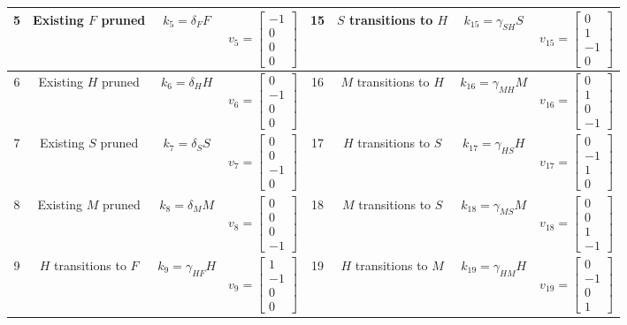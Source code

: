 \documentclass[11pt]{article}
\begin{document}
\begin{table}[h!]
{\begin{tabular}{|c|c|c|c||c|c|c|c|}
\hline
5 & Existing $F$ pruned & $k_5=\delta_FF$ & $v_5=\begin{bmatrix}-1\\0\\0\\0\end{bmatrix}$ & 15 & $S$ transitions to $H$ & $k_{15}=\gamma_{SH}S$ & $v_{15}=\begin{bmatrix}0\\1\\-1\\0\end{bmatrix}$\\
\hline
6 & Existing $H$ pruned & $k_6=\delta_HH$ & $v_6=\begin{bmatrix}0\\-1\\0\\0\end{bmatrix}$ & 16 & $M$ transitions to $H$ & $k_{16}=\gamma_{MH}M$ & $v_{16}=\begin{bmatrix}0\\1\\0\\-1\end{bmatrix}$\\
\hline
7 & Existing $S$ pruned & $k_7=\delta_SS$ & $v_7=\begin{bmatrix}0\\0\\-1\\0\end{bmatrix}$ & 17 & $H$ transitions to $S$ & $k_{17}=\gamma_{HS}H$ & $v_{17}=\begin{bmatrix}0\\-1\\1\\0\end{bmatrix}$\\
\hline
8 & Existing $M$ pruned & $k_8=\delta_MM$ & $v_8=\begin{bmatrix}0\\0\\0\\-1\end{bmatrix}$ & 18 & $M$ transitions to $S$ & $k_{18}=\gamma_{MS}M$ & $v_{18}=\begin{bmatrix}0\\0\\1\\-1\end{bmatrix}$\\
\hline
9 & $H$ transitions to $F$ & $k_9=\gamma_{HF}H$ & $v_9=\begin{bmatrix}1\\-1\\0\\0\end{bmatrix}$ & 19 & $H$ transitions to $M$ & $k_{19}=\gamma_{HM}H$ & $v_{19}=\begin{bmatrix}0\\-1\\0\\1\end{bmatrix}$\\

\end{tabular}}
\end{table}
\end{document}
